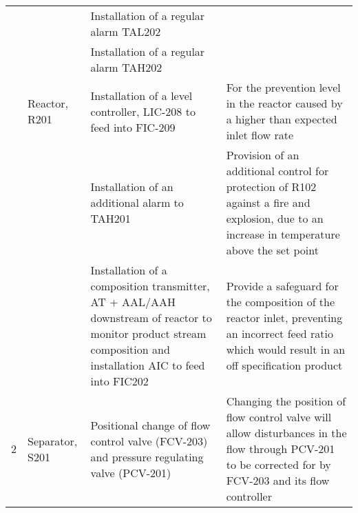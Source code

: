 {\begin{tabular}{@{}l>{\raggedright}p{2cm}p{7cm}p{10cm}@{}}
    &                           & Installation of a regular alarm TAL202                                                                                                                        &                                                                                                                                                                                                              \\ \cmidrule(lr){3-3}
    &                           & Installation of a regular alarm TAH202                                                                                                                        &                                                                                                                                                                                                              \\ \cmidrule(l){2-4} 
    & Reactor, R201             & Installation of a level controller, LIC-208 to feed into FIC-209                                                                                              & For the prevention level in the reactor caused by a higher than expected inlet flow rate                                                                                                                     \\ \cmidrule(l){3-4}
    &                           & Installation of an additional alarm to TAH201                                                                                                                 & Provision of an additional control for protection of R102 against a fire and explosion, due to an increase in temperature above the set point                                                                \\ \cmidrule(l){3-4}
    &                           & Installation of a composition transmitter, AT + AAL/AAH downstream of reactor to monitor product stream composition and installation AIC to feed into FIC202  & Provide a safeguard for the composition of the reactor inlet, preventing an incorrect feed ratio which would result in an off specification product                                                          \\ \midrule
2   & Separator, S201           &      Positional change of flow control valve (FCV-203) and pressure regulating valve (PCV-201)                                                                                                                                                         &         Changing the position of flow control valve will allow disturbances in the flow through PCV-201 to be corrected for by FCV-203 and its flow controller                                                                                                                                                                                                     \\ \cmidrule(l){2-4} 

\end{tabular}}
